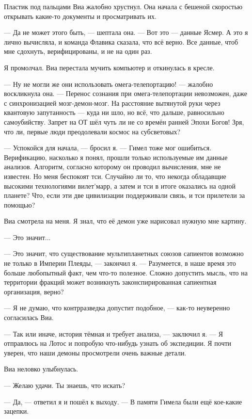 Пластик под пальцами Виа жалобно хрустнул.
Она начала с бешеной скоростью открывать какие-то документы и просматривать их.

--- Да не может этого быть, --- шептала она.
--- Вот это --- данные Ясмер.
А это я лично вычисляла, и команда Флавика сказала, что всё верно.
Все данные, чтоб мне сдохнуть, верифицированы, и не на один раз.

Я промолчал.
Виа перестала мучить компьютер и откинулась в кресле.

--- Ну не могли же они использовать омега-телепортацию! --- жалобно воскликнула она.
--- Перенос сознания при омега-телепортации невозможен, даже с синхронизацией мозг-демон-мозг.
На расстояние вытянутой руки через квантовую запутанность --- куда ни шло, но всё, что дальше, равносильно самоубийству.
Запрет на ОТ шёл чуть ли не со времён ранней Эпохи Богов!
Зря, что ли, первые люди преодолевали космос на субсветовых?

--- Успокойся для начала, --- бросил я.
--- Гимел тоже мог ошибиться.
Верификацию, насколько я понял, прошли только используемые им данные анализов.
Алгоритм, согласно которому он проводил вычисления, мне не известен.
Но меня беспокоят тси.
Случайно ли то, что некогда обладавщие высокими технологиями вилет'марр, а затем и тси в итоге оказались на одной планете?
Что, если эти две цивилизации поддерживали связь, и тси прилетели за помощью?

Виа смотрела на меня.
Я знал, что её демон уже нарисовал нужную мне картину.

--- Это значит...

--- Это значит, что существование мультипланетных союзов сапиентов возможно не только в Империи Плеяды, --- закончил я.
--- Разумеется, в наше время это больше любопытный факт, чем что-то полезное.
Сложно допустить мысль, что на территории фракций может возникнуть законспирированная сапиентная организация, верно?

--- Я не думаю, что контрразведка допустит подобное, --- как-то неуверенно согласилась Виа.

--- Так или иначе, история тёмная и требует анализа, --- заключил я.
--- Я отправлюсь на Лотос и попробую что-нибудь узнать об экспедиции.
Я почти уверен, что наши демоны просмотрели очень важные детали.

Виа неловко улыбнулась.

--- Желаю удачи.
Ты знаешь, что искать?

--- Да, --- ответил я и пошёл к выходу.
--- В памяти Гимела были ещё кое-какие зацепки.

